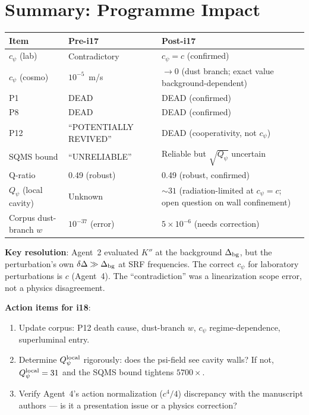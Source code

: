 \documentclass[11pt]{article}
\newcommand{\ee}[1]{\times 10^{#1}}
\newcommand{\Qpsi}{Q_\psi}
\begin{document}
\part{Summary: Programme Impact}
\label{part:summary}

\begin{tcolorbox}[colback=green!5!white, colframe=green!60!black,
  title=\textbf{i17 RESOLUTION SUMMARY}]

\begin{tabular}{@{}p{4cm}p{3cm}p{5cm}@{}}
\toprule
\textbf{Item} & \textbf{Pre-i17} & \textbf{Post-i17} \\
\midrule
$c_\psi$ (lab) & Contradictory & $c_\psi = c$ (confirmed) \\
$c_\psi$ (cosmo) & $10^{-5}$~m/s & $\to 0$ (dust branch; exact value background-dependent) \\
P1 & DEAD & DEAD (confirmed) \\
P8 & DEAD & DEAD (confirmed) \\
P12 & ``POTENTIALLY REVIVED'' & DEAD (cooperativity, not $c_\psi$) \\
SQMS bound & ``UNRELIABLE'' & Reliable but $\sqrt{\Qpsi}$ uncertain \\
Q-ratio & 0.49 (robust) & 0.49 (robust, confirmed) \\
$\Qpsi$ (local cavity) & Unknown & $\sim 31$ (radiation-limited at $c_\psi = c$; open question on wall confinement) \\
Corpus dust-branch $w$ & $10^{-37}$ (error) & $5\ee{-6}$ (needs correction) \\
\bottomrule
\end{tabular}

\textbf{Key resolution}: Agent~2 evaluated $K''$ at the background
$\Delta_{\rm bg}$, but the perturbation's own $\delta\Delta \gg
\Delta_{\rm bg}$ at SRF frequencies. The correct $c_\psi$ for
laboratory perturbations is $c$ (Agent~4). The ``contradiction'' was
a linearization scope error, not a physics disagreement.

\textbf{Action items for i18}:
\begin{enumerate}
\item Update corpus: P12 death cause, dust-branch $w$, $c_\psi$
  regime-dependence, superluminal entry.
\item Determine $\Qpsi^{\rm local}$ rigorously: does the psi-field
  see cavity walls? If not, $\Qpsi^{\rm local} = 31$ and the SQMS
  bound tightens $5700\times$.
\item Verify Agent~4's action normalization ($c^4/4$) discrepancy
  with the manuscript authors --- is it a presentation issue or a
  physics correction?
\end{enumerate}

\end{tcolorbox}
\end{document}
